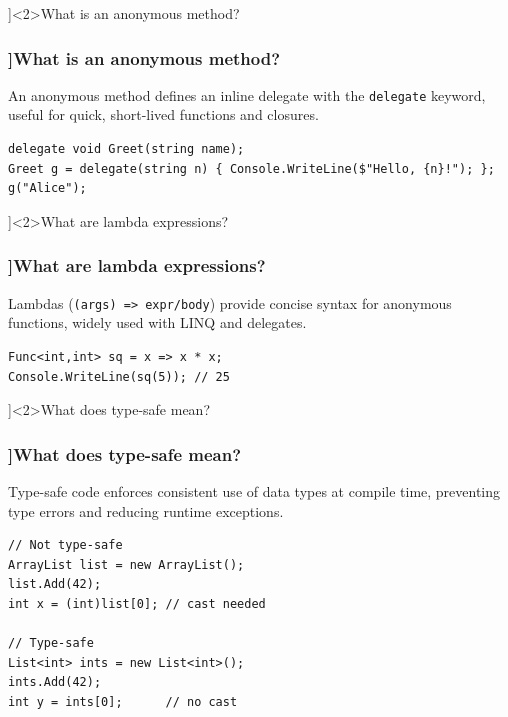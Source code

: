 \QuestionSlide[\CategoryBadge[LangColor!20]{Language Feature}]<2>{What is an anonymous method?}
\begin{frame}[fragile]
  \frametitle{\AnswerTitle[\CategoryBadge[LangColor!20]{Language Feature}]{What is an anonymous method?}}

  {\footnotesize
    An anonymous method defines an inline delegate with the \texttt{delegate} keyword, useful for quick, short-lived functions and closures.
  }

  \begin{verbatim}
delegate void Greet(string name);
Greet g = delegate(string n) { Console.WriteLine($"Hello, {n}!"); };
g("Alice");
  \end{verbatim}
\end{frame}

\QuestionSlide[\CategoryBadge[LangColor!20]{Language Feature}]<2>{What are lambda expressions?}
\begin{frame}[fragile]
  \frametitle{\AnswerTitle[\CategoryBadge[LangColor!20]{Language Feature}]{What are lambda expressions?}}

  {\footnotesize
    Lambdas (\texttt{(args) => expr/body}) provide concise syntax for anonymous functions, widely used with LINQ and delegates.
  }

  \begin{verbatim}
Func<int,int> sq = x => x * x;
Console.WriteLine(sq(5)); // 25
  \end{verbatim}
\end{frame}

\QuestionSlide[\CategoryBadge[LangColor!20]{Language Feature}]<2>{What does type-safe mean?}
\begin{frame}[fragile]
  \frametitle{\AnswerTitle[\CategoryBadge[LangColor!20]{Language Feature}]{What does type-safe mean?}}

  {\footnotesize
    Type-safe code enforces consistent use of data types at compile time, preventing type errors and reducing runtime exceptions.
  }

  \begin{verbatim}
// Not type-safe
ArrayList list = new ArrayList();
list.Add(42);
int x = (int)list[0]; // cast needed

// Type-safe
List<int> ints = new List<int>();
ints.Add(42);
int y = ints[0];      // no cast
  \end{verbatim}
\end{frame}


